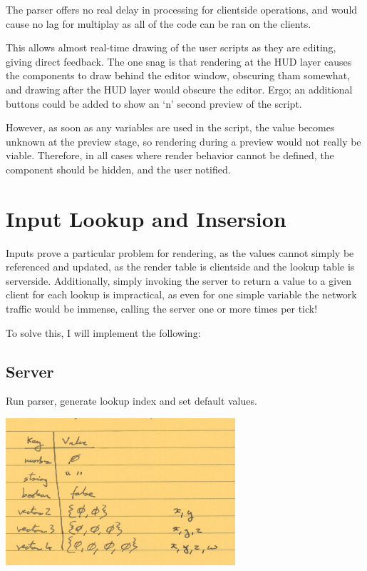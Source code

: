 \documentclass[10pt,a4paper]{article}
\begin{document}
The parser offers no real delay in processing for clientside operations, and would cause no lag for multiplay as all of the code can be ran on the clients.

This allows almost real-time drawing of the user scripts as they are editing, giving direct feedback.  The one snag is that rendering at the HUD layer causes the components to draw behind the editor window, obscuring tham somewhat, and drawing after the HUD layer would obscure the editor.  Ergo; an additional buttons could be added to show an `n' second preview of the script.

However, as soon as any variables are used in the script, the value becomes unknown at the preview stage, so rendering during a preview would not really be viable.  Therefore, in all cases where render behavior cannot be defined, the component should be hidden, and the user notified.

\section{Input Lookup and Insersion}

Inputs prove a particular problem for rendering, as the values cannot simply be referenced and updated, as the render table is clientside and the lookup table is serverside.  Additionally, simply invoking the server to return a value to a given client for each lookup is impractical, as even for one simple variable the network traffic would be immense, calling the server one or more times per tick!

To solve this, I will implement the following:

\subsection{Server}

Run parser, generate lookup index and set default values.

\includegraphics[scale=0.75]{images/server_lookup_table_types.png}
\end{document}
